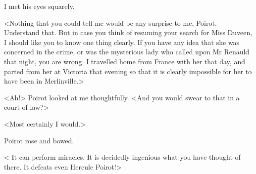  I met his eyes squarely. 

 <Nothing that you could tell me would be any surprise to me, Poirot. Understand that. But in case you think of resuming your search for Miss Duveen, I should like you to know one thing clearly. If you have any idea that she was concerned in the crime, or was the mysterious lady who called upon Mr Renauld that night, you are wrong. I travelled home from France with her that day, and parted from her at Victoria that evening so that it is clearly impossible for her to have been in Merlinville.> 

 <Ah!> Poirot looked at me thoughtfully. <And you would swear to that in a court of law?> 

 <Most certainly I would.> 

 Poirot rose and bowed. 

 < It can perform miracles. It is decidedly ingenious what you have thought of there. It defeats even Hercule Poirot!>